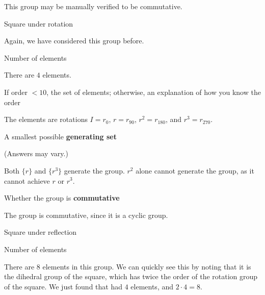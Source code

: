 \documentclass[../key.tex]{subfiles}
\begin{document}
\noindent This group may be manually verified to be commutative.

\begin{outer_problem}
\item Square under rotation
\end{outer_problem}

\noindent Again, we have considered this group before.

\begin{inner_problem}[start=1]
\item Number of elements
\end{inner_problem}

\noindent There are $4$ elements.

\begin{inner_problem}
\item If order $< 10$, the set of elements; otherwise, an explanation of how you know the order
\end{inner_problem}

\noindent The elements are rotations $I=r_0$, $r=r_{90}$, $r^2=r_{180}$, and $r^3=r_{270}$.

\begin{inner_problem}
\item A smallest possible \textbf{generating set}
\end{inner_problem}

\noindent (Answers may vary.)

Both $\{r\}$ and $\{r^3\}$ generate the group. $r^2$ alone cannot generate the group, as it cannot achieve $r$ or $r^3$.

\begin{inner_problem}
\item Whether the group is \textbf{commutative}
\end{inner_problem}

\noindent The group is commutative, since it is a cyclic group.

\begin{outer_problem}
\item Square under reflection
\end{outer_problem}

\begin{inner_problem}[start=1]
\item Number of elements
\end{inner_problem}

\noindent There are $8$ elements in this group. We can quickly see this by noting that it is the dihedral group of the square, which has twice the order of the rotation group of the square. We just found that had $4$ elements, and $2\cdot 4=8$.
\end{document}
